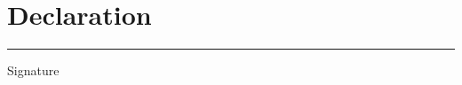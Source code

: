 \chapter*{Declaration}
\thispagestyle{empty}


\vspace{3cm}
\noindent\thesissignaturedate\hfill\rule{6cm}{0.4pt}\par
\hfill Signature
